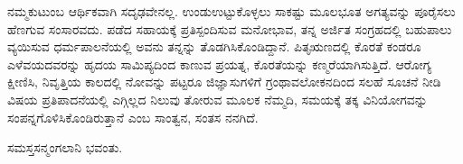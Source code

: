 {ನಮ್ಮಕುಟುಂಬ ಆರ್ಥಿಕವಾಗಿ ಸದೃಢವೇನಲ್ಲ.  ಉಂಡು\enginline{-}ಉಟ್ಟುಕೊಳ್ಳಲು  ಸಾಕಷ್ಟು  ಮೂಲಭೂತ ಅಗತ್ಯವನ್ನು ಪೂರೈಸಲು ಹೆಣಗುವ ಸಂಸಾರವದು. ಪಡೆದ ಸಹಾಯಕ್ಕೆ ಪ್ರತಿಸ್ಪಂದಿಸುವ ಮನೋಭಾವ, ತನ್ನ ಅರ್ಜಿತ ಸಂಗ್ರಹದಲ್ಲಿ ಬಹುಪಾಲು ವ್ಯಯಿಸುವ ಧರ್ಮಪಾಲನೆಯಲ್ಲಿ ಅವನು ತನ್ನನ್ನು ತೊಡಗಿಸಿಕೊಂಡಿದ್ದಾನೆ. ಪಿತೃಋಣದಲ್ಲಿ ಕೊರತೆ ಕಂಡರೂ ಎಳೆವಯದವರನ್ನು ಹೃದಯ ಸಾಮಿಪ್ಯದಿಂದ ಕಾಣುವ ಪ್ರಯತ್ನ, ಕೊರತೆಯನ್ನು ಕಣ್ಮರೆಯಾಗಿಸುತ್ತಿದೆ.  ಆರೋಗ್ಯ  ಕ್ಷೀಣಿಸಿ, ನಿವೃತ್ತಿಯ ಕಾಲದಲ್ಲಿ ನೋವನ್ನು ಪಟ್ಟರೂ ಜಿಜ್ಞಾಸುಗಳಿಗೆ ಗ್ರಂಥಾವಲೋಕನದಿಂದ ಸಲಹೆ ಸೂಚನೆ ನೀಡಿ ವಿಷಯ ಪ್ರತಿಪಾದನೆಯಲ್ಲಿ ಎಗ್ಗಿಲ್ಲದ ನಿಲುವು ತೋರುವ ಮೂಲಕ ನೆಮ್ಮದಿ,  ಸಮಯಕ್ಕೆ ತಕ್ಕ \hbox{ವಿನಿಯೋಗವನ್ನು} ಸಂಪನ್ನಗೊಳಿಸಿಕೊಂಡಿರುತ್ತಾನೆ  ಎಂಬ ಸಾಂತ್ವನ,  ಸಂತಸ ನನಗಿದೆ.  
~\\[0.3cm]
\centerline{ಸಮಸ್ತಸನ್ಮಂಗಲಾನಿ ಭವಂತು.}


\articleend
}
